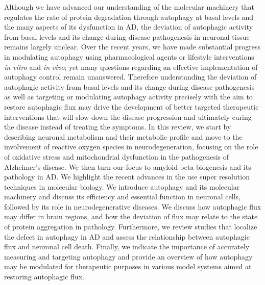 Although we have advanced our understanding of the molecular machinery that regulates the rate of protein degradation through autophagy at basal levels and the many aspects of its dysfunction in AD, the deviation of autophagic activity from basal levels and its change during disease pathogenesis in neuronal tissue remains largely unclear. Over the recent years, we have made substantial progress in modulating autophagy using pharmacological agents \citep{Berger2006,Hebron2013,Ravikumar2002,Ravikumar2004,Rose2010} or lifestyle interventions \citep{Alirezaei2010,Kuma2004,Mizushima2004a,Scott2004} \textit{in vitro} and \textit{in vivo}; yet many questions regarding an effective implementation of autophagy control remain unanswered. Therefore understanding the deviation of autophagic activity from basal levels and its change during disease pathogenesis as well as targeting or modulating autophagy activity precisely with the aim to restore autophagic flux may drive the development of better targeted therapeutic interventions that will slow down the disease progression and ultimately curing the disease instead of treating the symptoms. In this review, we start by describing neuronal metabolism and their metabolic profile and move to the involvement of reactive oxygen species in neurodegeneration, focusing on the role of oxidative stress and mitochondrial dysfunction in the pathogenesis of Alzheimer’s disease. We then turn our focus to amyloid beta biogenesis and its pathology in AD.  We highlight the recent advances in the use super resolution techniques in molecular biology. We introduce autophagy and its molecular machinery and discuss its efficiency and essential function in neuronal cells, followed by its role in neurodegenerative diseases. We discuss how autophagic flux may differ in brain regions, and how the deviation of flux may relate to the state of protein aggregation in pathology. Furthermore, we review studies that localize the defect in autophagy in AD and assess the relationship between autophagic flux and neuronal cell death. Finally, we indicate the importance of accurately measuring and targeting autophagy and provide an overview of how autophagy may be modulated for therapeutic purposes in various model systems aimed at restoring autophagic flux. 


